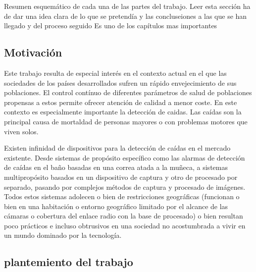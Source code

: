 \documentclass[../tfm.tex]{subfiles}
\begin{document}
Resumen esquemático de cada una de las partes del trabajo. Leer esta sección ha de dar una idea clara de lo que se pretendía y las concluseiones a las que se han llegado y del proceso seguido
Es uno de los capítulos mas importantes

\subsection{Motivación}

Este trabajo resulta de especial interés en el contexto actual en el que las sociedades de los países desarrollados sufren un rápido envejecimiento de sus poblaciones. El control contínuo de diferentes parámetros de salud de poblaciones propensas a estos permite ofrecer atención de calidad a menor coste. En este contexto es especialmente importante la detección de caidas. Las caídas son la principal causa de mortaldad de personas mayores o con problemas motores que viven solos.

Existen infinidad de dispositivos para la detección de caídas en el mercado existente. Desde sistemas de propósito específico como las alarmas de detección de caídas en el baño basadas en una correa atada a la muñeca, a sistemas multipropósito basados en un dispositivo de captura y otro de procesado por separado, pasando por complejos métodos de captura y procesado de imágenes. Todos estos sistemas adolecen o bien de restricciones geográficas (funcionan o bien en una habitación o entorno geográfico limitado por el alcance de las cámaras o cobertura del enlace radio con la base de procesado) o bien resultan poco prácticos e incluso obtrusivos en una sociedad no acostumbrada a vivir en un mundo dominado por la tecnología.

\subsection{plantemiento del trabajo}
\end{document}
